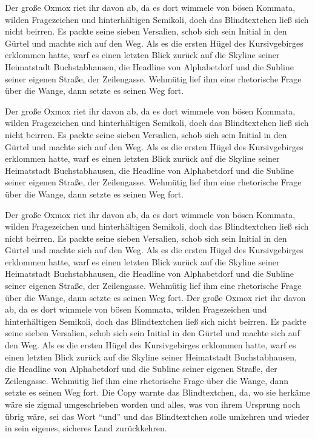 \documentclass[%
	12pt,%
	a4paper,%
	oneside,%
 liststotoc, idxtotoc, bibtotoc, %
	halfparskip,%
	nochapterprefix,%
	appendixprefix, %
smallheadings,%
]{scrreprt}
\begin{document}
Der große Oxmox riet ihr davon ab, da es dort wimmele von bösen Kommata, wilden Fragezeichen und hinterhältigen Semikoli, doch das Blindtextchen ließ sich nicht beirren. Es packte seine sieben Versalien, schob sich sein Initial in den Gürtel und machte sich auf den Weg. Als es die ersten Hügel des Kursivgebirges erklommen hatte, warf es einen letzten Blick zurück auf die Skyline seiner Heimatstadt Buchstabhausen, die Headline von Alphabetdorf und die Subline seiner eigenen Straße, der Zeilengasse. Wehmütig lief ihm eine rhetorische Frage über die Wange, dann setzte es seinen Weg fort.

Der große Oxmox riet ihr davon ab, da es dort wimmele von bösen Kommata, wilden Fragezeichen und hinterhältigen Semikoli, doch das Blindtextchen ließ sich nicht beirren. Es packte seine sieben Versalien, schob sich sein Initial in den Gürtel und machte sich auf den Weg. Als es die ersten Hügel des Kursivgebirges erklommen hatte, warf es einen letzten Blick zurück auf die Skyline seiner Heimatstadt Buchstabhausen, die Headline von Alphabetdorf und die Subline seiner eigenen Straße, der Zeilengasse. Wehmütig lief ihm eine rhetorische Frage über die Wange, dann setzte es seinen Weg fort.

Der große Oxmox riet ihr davon ab, da es dort wimmele von bösen Kommata, wilden Fragezeichen und hinterhältigen Semikoli, doch das Blindtextchen ließ sich nicht beirren. Es packte seine sieben Versalien, schob sich sein Initial in den Gürtel und machte sich auf den Weg. Als es die ersten Hügel des Kursivgebirges erklommen hatte, warf es einen letzten Blick zurück auf die Skyline seiner Heimatstadt Buchstabhausen, die Headline von Alphabetdorf und die Subline seiner eigenen Straße, der Zeilengasse. Wehmütig lief ihm eine rhetorische Frage über die Wange, dann setzte es seinen Weg fort. Der große Oxmox riet ihr davon ab, da es dort wimmele von bösen Kommata, wilden Fragezeichen und hinterhältigen Semikoli, doch das Blindtextchen ließ sich nicht beirren. Es packte seine sieben Versalien, schob sich sein Initial in den Gürtel und machte sich auf den Weg. Als es die ersten Hügel des Kursivgebirges erklommen hatte, warf es einen letzten Blick zurück auf die Skyline seiner Heimatstadt Buchstabhausen, die Headline von Alphabetdorf und die Subline seiner eigenen Straße, der Zeilengasse. Wehmütig lief ihm eine rhetorische Frage über die Wange, dann setzte es seinen Weg fort. Die Copy warnte das Blindtextchen, da, wo sie herkäme wäre sie zigmal umgeschrieben worden und alles, was von ihrem Ursprung noch übrig wäre, sei das Wort "`und"'  und das Blindtextchen solle umkehren und wieder in sein eigenes, sicheres Land zurückkehren.
\end{document}
